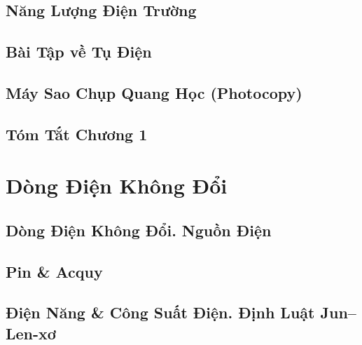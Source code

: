 \documentclass[oneside]{book}
\numberwithin{equation}{section}
\begin{document}
\section{Năng Lượng Điện Trường}


\section{Bài Tập về Tụ Điện}


\section{Máy Sao Chụp Quang Học (Photocopy)}


\section{Tóm Tắt Chương 1}


\chapter{Dòng Điện Không Đổi}

\section{Dòng Điện Không Đổi. Nguồn Điện}


\section{Pin \& Acquy}


\section{Điện Năng \& Công Suất Điện. Định Luật Jun--Len-xơ}
\end{document}
